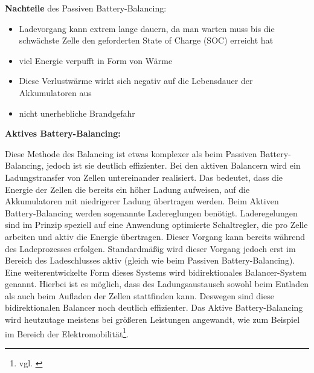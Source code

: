 \textbf{Nachteile} des Passiven Battery-Balancing:
\begin{itemize}
\item {Ladevorgang kann extrem lange dauern, da man warten muss bis die schwächste Zelle den geforderten State of Charge (SOC) erreicht hat} \medskip\\
\item {viel Energie verpufft in Form von Wärme} \medskip\\
\item {Diese Verlustwärme wirkt sich negativ auf die Lebensdauer der Akkumulatoren aus} \medskip\\
\item {nicht unerhebliche Brandgefahr} \medskip\\
\end{itemize}
\newpage

\textbf{Aktives Battery-Balancing:}

Diese Methode des Balancing ist etwas komplexer als beim Passiven Battery-Balancing, jedoch ist sie deutlich effizienter. Bei den aktiven Balancern wird ein Ladungstransfer von Zellen untereinander realisiert. Das bedeutet, dass die Energie der Zellen die bereits ein höher Ladung aufweisen, auf die Akkumulatoren mit niedrigerer Ladung übertragen werden. Beim Aktiven Battery-Balancing werden sogenannte Ladereglungen benötigt. Laderegelungen sind im Prinzip speziell auf eine Anwendung optimierte Schaltregler, die pro Zelle arbeiten und aktiv die Energie übertragen. Dieser Vorgang kann bereits während des Ladeprozesses erfolgen. Standardmäßig wird dieser Vorgang jedoch erst im Bereich des Ladeschlusses aktiv (gleich wie beim Passiven Battery-Balancing). Eine weiterentwickelte Form dieses Systems wird bidirektionales Balancer-System genannt. Hierbei ist es möglich, dass des Ladungsaustausch sowohl beim Entladen als auch beim Aufladen der Zellen stattfinden kann. Deswegen sind diese bidirektionalen Balancer noch deutlich effizienter. Das Aktive Battery-Balancing wird heutzutage meistens bei größeren Leistungen angewandt, wie zum Beispiel im Bereich der Elektromobilität\footnote{vgl. \cite{AktivBalancing}}.

